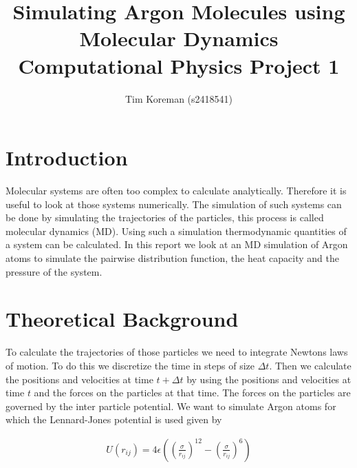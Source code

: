 \documentclass[10 pt, a4paper]{article}
\title{
 Simulating Argon Molecules using Molecular Dynamics \\
  \Large Computational Physics Project 1
}
\author{Tim Koreman (s2418541)}
\begin{document}
\maketitle



\section{Introduction}

Molecular systems are often too complex to calculate analytically. Therefore it is useful to look  at those systems numerically. The simulation of such systems can be done by simulating the trajectories of the particles, this process is called molecular dynamics (MD). Using such a simulation thermodynamic quantities of a system can be calculated. In this report we look at an MD simulation of Argon atoms to simulate the pairwise distribution function, the heat capacity and the pressure of the system.

\section{Theoretical Background} \label{sec:theo}

To calculate the trajectories of those particles we need to integrate Newtons laws of motion. To do this we discretize the time in steps of size $\Delta t$. Then we calculate the positions and velocities at time $t + \Delta t$ by using the positions and velocities at time $t$ and the forces on the particles at that time. The forces on the particles are governed by the inter particle potential. We want to simulate Argon atoms for which the Lennard-Jones potential is used  given by

\begin{align}
U(r_{ij}) = 4 \epsilon \left( \left( \frac{\sigma}{r_{ij}} \right)^{12} - \left( \frac{\sigma}{r_{ij}} \right)^{6} \right)
\end{align}
\end{document}
